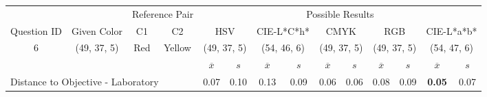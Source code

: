 \begin{table}[H]
  \resizebox{\textwidth}{!} {
  \begin{tabular}{lccccccccccccc}
    \hline
    \multicolumn{1}{c}{}                              &                                      & \multicolumn{2}{c}{Reference Pair}                   & \multicolumn{10}{c}{Possible Results}                                                                                                                                                                                                                                                                                        \\ \cline{3-14}
    \multicolumn{1}{c}{\multirow{-2}{*}{Question ID}} & \multirow{-2}{*}{Given Color}        & C1                       & C2                         & \multicolumn{2}{c}{HSV}                                        & \multicolumn{2}{c}{CIE-L*C*h*}                                 & \multicolumn{2}{c}{CMYK}                                       & \multicolumn{2}{c}{RGB}                                        & \multicolumn{2}{c}{CIE-L*a*b*}                                 \\ \hline
    \multicolumn{1}{c}{6}                             & \cellcolor[HTML]{FF8000}(49, 37, 5) & \multicolumn{1}{c|}{Red} & \multicolumn{1}{c|}{Yellow}  & \multicolumn{2}{c|}{\cellcolor[HTML]{FF8000}(49, 37, 5)}      & \multicolumn{2}{c|}{\cellcolor[HTML]{FF9F00}(54, 46, 6)}       & \multicolumn{2}{c|}{\cellcolor[HTML]{FF8000}(49, 37, 5)}       & \multicolumn{2}{c|}{\cellcolor[HTML]{FF8000}(49, 37, 5)}       & \multicolumn{2}{c|}{\cellcolor[HTML]{FFA100}(54, 47, 6)}       \\ \hline
                                                      & \multicolumn{1}{l}{}                 & \multicolumn{1}{l}{}     & \multicolumn{1}{l}{}       & \multicolumn{1}{c}{$\overline{x}$} & \multicolumn{1}{c}{$s$} & \multicolumn{1}{c}{$\overline{x}$} & \multicolumn{1}{c}{$s$} & \multicolumn{1}{c}{$\overline{x}$} & \multicolumn{1}{c}{$s$} & \multicolumn{1}{c}{$\overline{x}$} & \multicolumn{1}{c}{$s$} & \multicolumn{1}{c}{$\overline{x}$} & \multicolumn{1}{c}{$s$} \\ \hline
    \multicolumn{4}{l}{Distance to Objective - Laboratory}                                                                                           & \multicolumn{1}{|c}{0.07}       & \multicolumn{1}{c|}{0.10}    & \multicolumn{1}{|c}{0.13}       & \multicolumn{1}{c|}{0.09}    & \multicolumn{1}{|c}{0.06}       & \multicolumn{1}{c|}{0.06}    & \multicolumn{1}{|c}{0.08}       & \multicolumn{1}{c|}{0.09}    & \multicolumn{1}{|c}{\textbf{0.05}}       & \multicolumn{1}{c|}{0.07}    \\

\end{tabular}}
\end{table}

